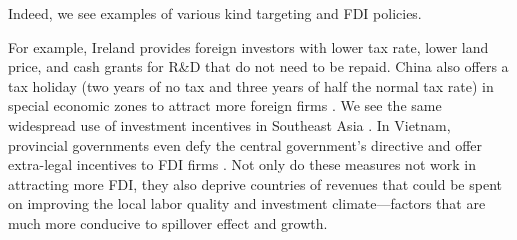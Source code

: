 Indeed, we see examples of various kind targeting and FDI policies.

For example, Ireland provides foreign investors with lower tax rate, lower land price, and cash grants for R\&D that do not need to be repaid. China also offers a tax holiday (two years of no tax and three years of half the normal tax rate) in special economic zones to attract more foreign firms \citep{Telford2001}. We see the same widespread use of investment incentives in Southeast Asia \citep{Fletcher2002}. In Vietnam, provincial governments even defy the central government's directive and offer extra-legal incentives to FDI firms \citep{Vu2007}. Not only do these measures not work in attracting more FDI, they also deprive countries of revenues that could be spent on improving the local labor quality and investment climate---factors that are much more conducive to spillover effect and growth.

